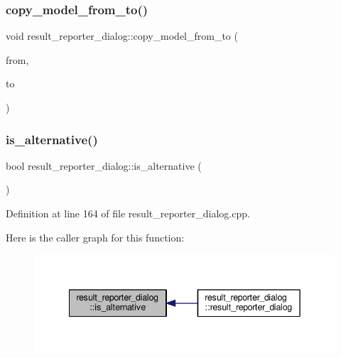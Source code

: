 \subsubsection{\texorpdfstring{copy\+\_\+model\+\_\+from\+\_\+to()}{copy\_model\_from\_to()}\hspace{0.1cm}{\footnotesize\ttfamily [2/2]}}
{\footnotesize\ttfamily void result\+\_\+reporter\+\_\+dialog\+::copy\+\_\+model\+\_\+from\+\_\+to (\begin{DoxyParamCaption}\item[{Q\+Standard\+Item\+Model $\ast$}]{from,  }\item[{Q\+Standard\+Item\+Model $\ast$}]{to }\end{DoxyParamCaption})\hspace{0.3cm}{\ttfamily [private]}}

\mbox{\label{classresult__reporter__dialog_a81b094141eb2eac2fb683f77eb78dd75}} 
\subsubsection{\texorpdfstring{is\+\_\+alternative()}{is\_alternative()}}
{\footnotesize\ttfamily bool result\+\_\+reporter\+\_\+dialog\+::is\+\_\+alternative (\begin{DoxyParamCaption}{ }\end{DoxyParamCaption})\hspace{0.3cm}{\ttfamily [private]}}



Definition at line 164 of file result\+\_\+reporter\+\_\+dialog.\+cpp.

Here is the caller graph for this function\+:\nopagebreak
\begin{figure}[H]
\begin{center}
\leavevmode
\includegraphics[width=342pt]{classresult__reporter__dialog_a81b094141eb2eac2fb683f77eb78dd75_icgraph}
\end{center}
\end{figure}
\mbox{\label{classresult__reporter__dialog_acd982d3fb89f9d533015850dfc952439}} 
